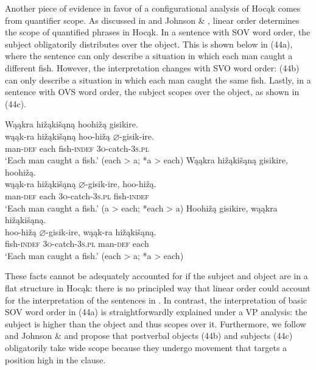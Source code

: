 \documentclass[output=paper]{LSP/langsci}
\begin{document}
Another piece of evidence in favor of a configurational analysis of Hocąk comes from quantifier scope. As discussed in \citealt{Johnson2014} and Johnson \& \citealt{Rosen2014}, linear order determines the scope of quantified phrases in Hocąk. In a sentence with SOV word order, the subject obligatorily distributes over the object. This is shown below in (44a), where the sentence can only describe a situation in which each man caught a different fish. However, the interpretation changes with SVO word order: (44b) can only describe a situation in which each man caught the same fish. Lastly, in a sentence with OVS word order, the subject scopes over the object, as shown in (44c).

\begin{exe}
\ex
\begin{xlist}
\ex 
\glll Wąąkra	hi\v{z}ąki\v{s}ąną		hoohi\v{z}ą	gisikire.\\
wąąk-ra		hi\v{z}ąki\v{s}ąną		hoo-hi\v{z}ą	$\varnothing$-gisik-ire. \\
		man-\textsc{def}		each					fish-\textsc{indef}		\textsc{3o}-catch-\textsc{3s.pl} \\
\trans `Each man caught a fish.' (each > a; *a > each)
\ex 
\glll Wąąkra		hi\v{z}ąki\v{s}ąną		gisikire,			hoohi\v{z}ą.\\
wąąk-ra		hi\v{z}ąki\v{s}ąną		$\varnothing$-gisik-ire,	hoo-hi\v{z}ą. \\
		man-\textsc{def}		each					\textsc{3o}-catch-\textsc{3s.pl}		fish-\textsc{indef} \\
\trans `Each man caught a fish.'  (a > each; *each > a)
\ex 
\glll Hoohi\v{z}ą	gisikire,	wąąkra	 hi\v{z}ąki\v{s}ąną.\\
hoo-hi\v{z}ą	$\varnothing$-gisik-ire,		wąąk-ra	hi\v{z}ąki\v{s}ąną. \\
		fish-\textsc{indef}		\textsc{3o}-catch-\textsc{3s.pl}		man-\textsc{def}		each \\
\trans `Each man caught a fish.' (each > a; *a > each)
\end{xlist}
\end{exe}

These facts cannot be adequately accounted for if the subject and object are in a flat structure in Hocąk: there is no principled way that linear order could account for the interpretation of the sentences in . In contrast, the interpretation of basic SOV word order in (44a) is straightforwardly explained under a VP analysis: the subject is higher than the object and thus scopes over it. Furthermore, we follow \citet{Johnson2014} and Johnson \& \citet{Rosen2014} and propose that postverbal objects (44b) and subjects (44c) obligatorily take wide scope because they undergo movement that targets a position high in the clause. 
\end{document}
